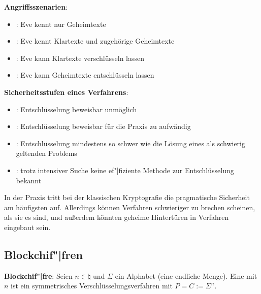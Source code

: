\linie

\textbf{Angriffsszenarien}:
\begin{itemize}
    \item
    :
    Eve kennt nur Geheimtexte

    \item
    :
    Eve kennt Klartexte und zugehörige Geheimtexte

    \item
    :
    Eve kann Klartexte verschlüsseln lassen

    \item
    :
    Eve kann Geheimtexte entschlüsseln lassen
\end{itemize}

\linie

\textbf{Sicherheitsstufen eines Verfahrens}:
\begin{itemize}
    \item
    :
    Entschlüsselung beweisbar unmöglich

    \item
    :
    Entschlüsselung beweisbar für die Praxis zu aufwändig

    \item
    :
    Entschlüsselung mindestens so schwer wie die Lösung eines als schwierig geltenden Problems

    \item
    :
    trotz intensiver Suche keine ef"|fiziente Methode zur Entschlüsselung bekannt
\end{itemize}
In der Praxis tritt bei der klassischen Kryptografie die pragmatische Sicherheit am häufigsten auf.
Allerdings können Verfahren schwieriger zu brechen scheinen, als sie es sind, und
außerdem könnten geheime Hintertüren in Verfahren eingebaut sein.

\pagebreak

\subsection{%
    Blockchif"|fren%
}

\textbf{Blockchif"|fre}:
Seien $n \in \natural$ und $\Sigma$ ein Alphabet (eine endliche Menge).
Eine  mit  $n$
ist ein symmetrisches Verschlüsselungsverfahren mit $P = C := \Sigma^n$.

